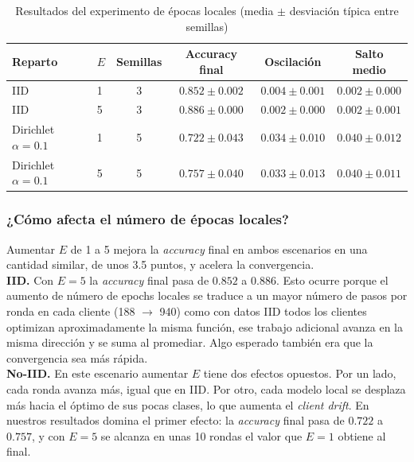 \begin{table}[H]
    \centering
    \caption{Resultados del experimento de épocas locales (media $\pm$ desviación típica entre semillas)}
    \label{tab:q2}
    \setlength{\tabcolsep}{5pt}
    \begin{tabular}{llcccc}
        \hline
        Reparto & $E$ & Semillas & Accuracy final & Oscilación & Salto medio \\
        \hline
        IID & 1 & 3 & $0.852 \pm 0.002$ & $0.004 \pm 0.001$ & $0.002 \pm 0.000$ \\
        IID & 5 & 3 & $0.886 \pm 0.000$ & $0.002 \pm 0.000$ & $0.002 \pm 0.001$ \\
        Dirichlet $\alpha=0.1$ & 1 & 5 & $0.722 \pm 0.043$ & $0.034 \pm 0.010$ & $0.040 \pm 0.012$ \\
        Dirichlet $\alpha=0.1$ & 5 & 5 & $0.757 \pm 0.040$ & $0.033 \pm 0.013$ & $0.040 \pm 0.011$ \\
        \hline
    \end{tabular}
\end{table}

\subsubsection{¿Cómo afecta el número de épocas locales?}
Aumentar $E$ de 1 a 5 mejora la \textit{accuracy} final en ambos escenarios en una cantidad similar, de unos 3.5
puntos, y acelera la convergencia.
\\

\textbf{IID.} Con $E=5$ la \textit{accuracy} final pasa de $0.852$ a $0.886$. Esto ocurre porque el aumento
de número de epochs locales se traduce a un mayor número de pasos por ronda en cada cliente (188 $\rightarrow$ 940)
como con datos IID todos los clientes optimizan aproximadamente la misma función, ese trabajo adicional avanza en 
la misma dirección y se suma al promediar. Algo esperado también era que la convergencia sea más rápida.
\\

\textbf{No-IID.} En este escenario aumentar $E$ tiene dos efectos opuestos. Por un lado, cada ronda avanza más,
igual que en IID. Por otro, cada modelo local se desplaza más hacia el óptimo de sus pocas clases, lo que aumenta
el \textit{client drift}. En nuestros resultados domina el primer efecto: la \textit{accuracy} final pasa de
$0.722$ a $0.757$, y con $E=5$ se alcanza en unas 10 rondas el valor que $E=1$ obtiene al final.
\\

